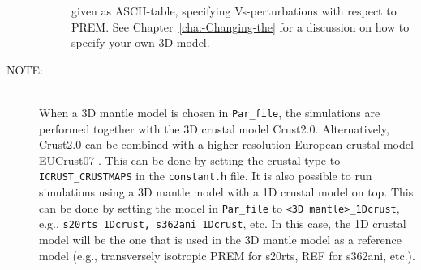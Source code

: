 \documentclass[oneside,english]{book}
\begin{document}
\begin{description}
\begin{description}
given as ASCII-table, specifying Vs-perturbations
with respect to PREM. See Chapter~\ref{cha:-Changing-the}
for a discussion on how to specify your own 3D model.
\end{description}
\item [{\textmd{NOTE:}}]~\\
When a 3D mantle model is chosen in \texttt{Par\_file}, the simulations are performed together with the 3D crustal model Crust2.0. Alternatively, Crust2.0 can be combined with a higher resolution European crustal model EUCrust07 \citep{EUCrust07}. This can be done by setting the crustal type to \texttt{ICRUST\_CRUSTMAPS} in the \texttt{constant.h} file.
It is also possible to run simulations using a 3D mantle model with a 1D crustal model on top. This can be done by setting the model in \texttt{Par\_file} to \texttt{<3D mantle>\_1Dcrust}, e.g., \texttt{s20rts\_1Dcrust, s362ani\_1Dcrust}, etc. In this case, the 1D crustal model will be the one that is used in the 3D mantle model as a reference model (e.g., transversely isotropic PREM for s20rts, REF for s362ani, etc.).


\end{description}
\end{document}
